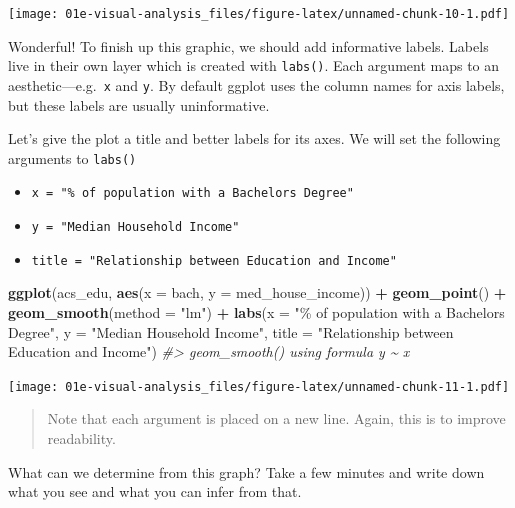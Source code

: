 \documentclass[
]{book}
\newenvironment{Shaded}{\begin{snugshade}}{\end{snugshade}}
\newcommand{\CommentTok}[1]{\textcolor[rgb]{0.56,0.35,0.01}{\textit{#1}}}
\newcommand{\DataTypeTok}[1]{\textcolor[rgb]{0.13,0.29,0.53}{#1}}
\newcommand{\KeywordTok}[1]{\textcolor[rgb]{0.13,0.29,0.53}{\textbf{#1}}}
\newcommand{\NormalTok}[1]{#1}
\newcommand{\OperatorTok}[1]{\textcolor[rgb]{0.81,0.36,0.00}{\textbf{#1}}}
\newcommand{\StringTok}[1]{\textcolor[rgb]{0.31,0.60,0.02}{#1}}
\providecommand{\tightlist}{%
  \setlength{\itemsep}{0pt}\setlength{\parskip}{0pt}}
\begin{document}
\texttt{[image: 01e-visual-analysis\_files/figure-latex/unnamed-chunk-10-1.pdf]}

Wonderful! To finish up this graphic, we should add informative labels. Labels live in their own layer which is created with \texttt{labs()}. Each argument maps to an aesthetic---e.g.~\texttt{x} and \texttt{y}. By default ggplot uses the column names for axis labels, but these labels are usually uninformative.

Let's give the plot a title and better labels for its axes. We will set the following arguments to \texttt{labs()}

\begin{itemize}
\tightlist
\item
  \texttt{x\ =\ "\%\ of\ population\ with\ a\ Bachelor\textquotesingle{}s\ Degree"}
\item
  \texttt{y\ =\ "Median\ Household\ Income"}
\item
  \texttt{title\ =\ "Relationship\ between\ Education\ and\ Income"}
\end{itemize}

\begin{Shaded}
\begin{Highlighting}[]
\KeywordTok{ggplot}\NormalTok{(acs\_edu, }\KeywordTok{aes}\NormalTok{(}\DataTypeTok{x =}\NormalTok{ bach, }\DataTypeTok{y =}\NormalTok{ med\_house\_income)) }\OperatorTok{+}
\StringTok{  }\KeywordTok{geom\_point}\NormalTok{() }\OperatorTok{+}
\StringTok{  }\KeywordTok{geom\_smooth}\NormalTok{(}\DataTypeTok{method =} \StringTok{"lm"}\NormalTok{) }\OperatorTok{+}
\StringTok{  }\KeywordTok{labs}\NormalTok{(}\DataTypeTok{x =} \StringTok{"\% of population with a Bachelor\textquotesingle{}s Degree"}\NormalTok{,}
       \DataTypeTok{y =} \StringTok{"Median Household Income"}\NormalTok{,}
       \DataTypeTok{title =} \StringTok{"Relationship between Education and Income"}\NormalTok{)}
\CommentTok{\#\textgreater{} \textasciigrave{}geom\_smooth()\textasciigrave{} using formula \textquotesingle{}y \textasciitilde{} x\textquotesingle{}}
\end{Highlighting}
\end{Shaded}

\texttt{[image: 01e-visual-analysis\_files/figure-latex/unnamed-chunk-11-1.pdf]}

\begin{quote}
Note that each argument is placed on a new line. Again, this is to improve readability.
\end{quote}

What can we determine from this graph? Take a few minutes and write down what you see and what you can infer from that.
\end{document}
